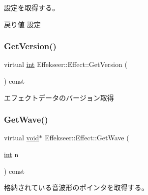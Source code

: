 設定を取得する。 

\begin{DoxyReturn}{戻り値}
設定 
\end{DoxyReturn}
\mbox{\label{class_effekseer_1_1_effect_a7dd2d6dd333e2d0cc3edcfea493017db}} 
\subsubsection{\texorpdfstring{Get\+Version()}{GetVersion()}}
{\footnotesize\ttfamily virtual \mbox{\hyperlink{namespace_effekseer_ace0abf7c2e6947e519ebe8b54cbcc30a}{int}} Effekseer\+::\+Effect\+::\+Get\+Version (\begin{DoxyParamCaption}{ }\end{DoxyParamCaption}) const\hspace{0.3cm}{\ttfamily [pure virtual]}}



エフェクトデータのバージョン取得 

\mbox{\label{class_effekseer_1_1_effect_a0ae3955ea4f21616c890c5ed2d411eea}} 
\subsubsection{\texorpdfstring{Get\+Wave()}{GetWave()}}
{\footnotesize\ttfamily virtual \mbox{\hyperlink{namespace_effekseer_ab34c4088e512200cf4c2716f168deb56}{void}}$\ast$ Effekseer\+::\+Effect\+::\+Get\+Wave (\begin{DoxyParamCaption}\item[{\mbox{\hyperlink{namespace_effekseer_ace0abf7c2e6947e519ebe8b54cbcc30a}{int}}}]{n }\end{DoxyParamCaption}) const\hspace{0.3cm}{\ttfamily [pure virtual]}}



格納されている音波形のポインタを取得する。 

\mbox{\label{class_effekseer_1_1_effect_af0a2c4cb045d9989619beedd078ff735}} 
